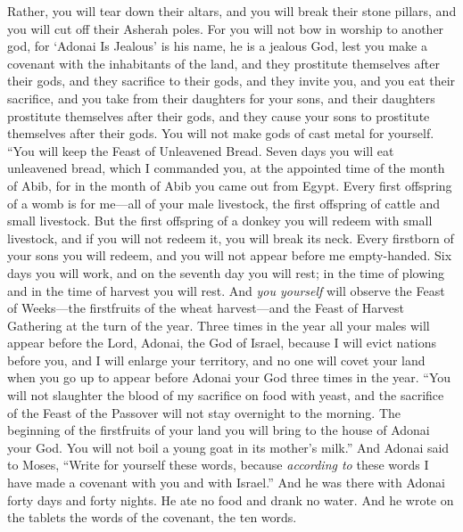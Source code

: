 \begin{biblechapter}
\verse Rather, you will tear down their altars, and you will break their stone pillars, and you will cut off their Asherah poles.
\verse For you will not bow in worship to another god, for ‘Adonai Is Jealous’ is his name, he is a jealous God,
\verse lest you make a covenant with the inhabitants of the land, and they prostitute themselves after their gods, and they sacrifice to their gods, and they invite you, and you eat their sacrifice,
\verse and you take from their daughters for your sons, and their daughters prostitute themselves after their gods, and they cause your sons to prostitute themselves after their gods.
\verse You will not make gods of cast metal for yourself.
\verse “You will keep the Feast of Unleavened Bread. Seven days you will eat unleavened bread, which I commanded you, at the appointed time of the month of Abib, for in the month of Abib you came out from Egypt.
\verse Every first offspring of a womb is for me—all of your male livestock, the first offspring of cattle and small livestock.
\verse But the first offspring of a donkey you will redeem with small livestock, and if you will not redeem it, you will break its neck. Every firstborn of your sons you will redeem, and you will not appear before me empty-handed.
\verse Six days you will work, and on the seventh day you will rest; in the time of plowing and in the time of harvest you will rest.
\verse And \textit{you yourself} will observe the Feast of Weeks—the firstfruits of the wheat harvest—and the Feast of Harvest Gathering at the turn of the year.
\verse Three times in the year all your males will appear before the Lord, Adonai, the God of Israel,
\verse because I will evict nations before you, and I will enlarge your territory, and no one will covet your land when you go up to appear before Adonai your God three times in the year.
\verse “You will not slaughter the blood of my sacrifice on food with yeast, and the sacrifice of the Feast of the Passover will not stay overnight to the morning.
\verse The beginning of the firstfruits of your land you will bring to the house of Adonai your God. You will not boil a young goat in its mother’s milk.”
\verse And Adonai said to Moses, “Write for yourself these words, because \textit{according to} these words I have made a covenant with you and with Israel.”
 And he was there with Adonai forty days and forty nights. He ate no food and drank no water. And he wrote on the tablets the words of the covenant, the ten words.

\end{biblechapter}
